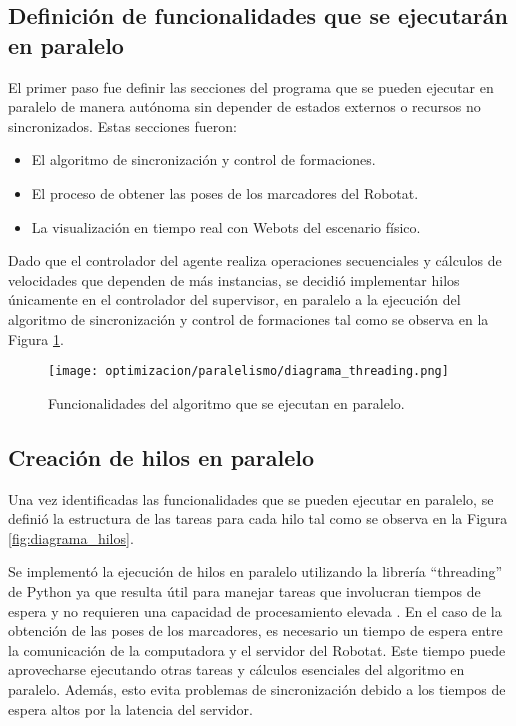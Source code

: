 \subsection{Definición de funcionalidades que se ejecutarán en paralelo}
El primer paso fue definir las secciones del programa que se pueden ejecutar en paralelo de manera autónoma sin depender de estados externos o recursos no sincronizados. Estas secciones fueron:
\begin{itemize}
	\item El algoritmo de sincronización y control de formaciones.
	\item El proceso de obtener las poses de los marcadores del Robotat.
	\item La visualización en tiempo real con Webots del escenario físico.
\end{itemize}

Dado que el controlador del agente realiza operaciones secuenciales y cálculos de velocidades que dependen de más instancias, se decidió implementar hilos únicamente en el controlador del supervisor, en paralelo a la ejecución del algoritmo de sincronización y control de formaciones tal como se observa en la Figura \ref{fig:hilos}.

\begin{figure}[H]
	\centering
	\texttt{[image: optimizacion/paralelismo/diagrama\_threading.png]}
	\caption{Funcionalidades del algoritmo que se ejecutan en paralelo.}
	\label{fig:hilos}
\end{figure}

\subsection{Creación de hilos en paralelo}

Una vez identificadas las funcionalidades que se pueden ejecutar en paralelo, se definió la estructura de las tareas para cada hilo tal como se observa en la Figura \ref{fig:diagrama_hilos}. 

Se implementó la ejecución de hilos en paralelo utilizando la librería ``threading'' de Python ya que resulta útil para manejar tareas que involucran tiempos de espera y no requieren una capacidad de procesamiento elevada \cite{PythonThreading}. En el caso de la obtención de las poses de los marcadores, es necesario un tiempo de espera entre la comunicación de la computadora y el servidor del Robotat. Este tiempo puede aprovecharse ejecutando otras tareas y cálculos esenciales del algoritmo en paralelo. Además, esto evita problemas de sincronización debido a los tiempos de espera altos por la latencia del servidor.

